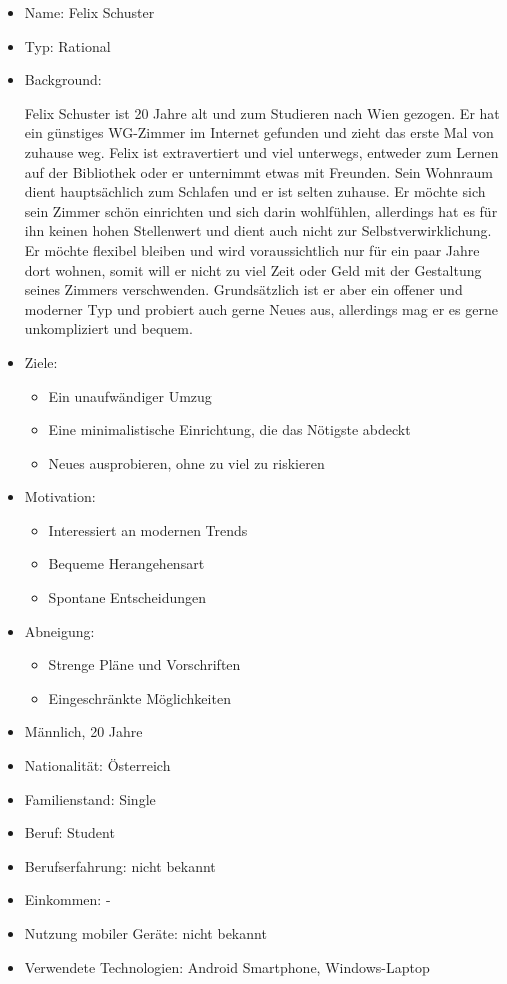 \documentclass[12pt,paper=a4,oneside,hidelinks,headings=small,captions=heading,captions=nooneline]{scrartcl}
\begin{document}
\begin{itemize}
\item Name: Felix Schuster
\item Typ: Rational
\item Background:

Felix Schuster ist 20 Jahre alt und zum Studieren nach Wien
gezogen. Er hat ein günstiges WG-Zimmer im Internet gefunden und
zieht das erste Mal von zuhause weg. Felix ist extravertiert und
viel unterwegs, entweder zum Lernen auf der Bibliothek oder er
unternimmt etwas mit Freunden. Sein Wohnraum dient hauptsächlich zum
Schlafen und er ist selten zuhause. Er möchte sich sein Zimmer schön
einrichten und sich darin wohlfühlen, allerdings hat es für ihn
keinen hohen Stellenwert und dient auch nicht zur
Selbstverwirklichung. Er möchte flexibel bleiben und wird
voraussichtlich nur für ein paar Jahre dort wohnen, somit will er
nicht zu viel Zeit oder Geld mit der Gestaltung seines Zimmers
verschwenden. Grundsätzlich ist er aber ein offener und moderner Typ
und probiert auch gerne Neues aus, allerdings mag er es gerne
unkompliziert und bequem.

\item Ziele:
\begin{itemize}
\item Ein unaufwändiger Umzug
\item Eine minimalistische Einrichtung, die das Nötigste abdeckt
\item Neues ausprobieren, ohne zu viel zu riskieren
\end{itemize}
\item Motivation:
\begin{itemize}
\item Interessiert an modernen Trends
\item Bequeme Herangehensart
\item Spontane Entscheidungen
\end{itemize}
\item Abneigung:
\begin{itemize}
\item Strenge Pläne und Vorschriften
\item Eingeschränkte Möglichkeiten
\end{itemize}
\item Männlich, 20 Jahre
\item Nationalität: Österreich
\item Familienstand: Single
\item Beruf: Student
\item Berufserfahrung: nicht bekannt
\item Einkommen: -
\item Nutzung mobiler Geräte: nicht bekannt
\item Verwendete Technologien: Android Smartphone, Windows-Laptop
\end{itemize}
\end{document}
